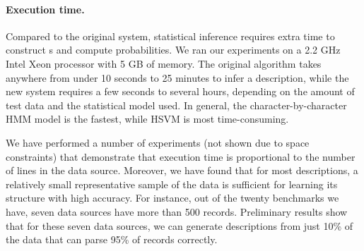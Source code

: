 \paragraph*{Execution time.}
Compared to the original system, 
statistical inference requires extra time to construct \seqset{}s and
compute probabilities. 
We ran our experiments on a 2.2 GHz Intel Xeon processor with 5
GB of memory. The original algorithm takes anywhere from 
under 10 seconds to 25 minutes to infer a description, while the new system
requires a few seconds to several hours, depending on the amount of test data
and the statistical model used. In general, the character-by-character
HMM model is the fastest, while HSVM is most time-consuming.

We have performed a number of experiments (not shown due to space 
constraints) that demonstrate that execution time is proportional
to the number of lines in the data source.  Moreover, we have
found that for most descriptions, a relatively small representative
sample of the data is sufficient for learning its structure with
high accuracy.
For instance, out of the twenty benchmarks we have, seven data sources
have more than 500 records.  Preliminary results show that for these
seven data sources, we can generate descriptions from just 10\% 
of the data that can parse 95\% of records correctly.


